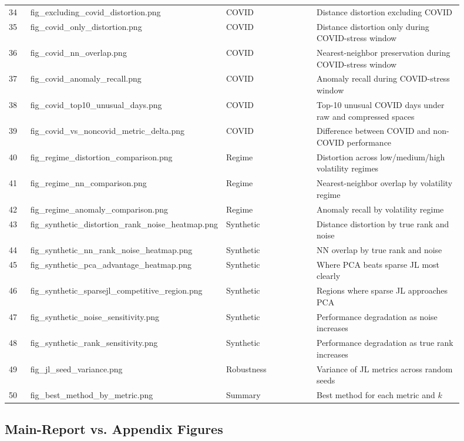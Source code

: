 \documentclass[11pt]{article}
\begin{document}
\begin{longtable}{p{0.05\linewidth} p{0.27\linewidth} p{0.22\linewidth} p{0.36\linewidth}}
34 & fig\_excluding\_covid\_distortion.png & COVID & Distance distortion excluding COVID \\
35 & fig\_covid\_only\_distortion.png & COVID & Distance distortion only during COVID-stress window \\
36 & fig\_covid\_nn\_overlap.png & COVID & Nearest-neighbor preservation during COVID-stress window \\
37 & fig\_covid\_anomaly\_recall.png & COVID & Anomaly recall during COVID-stress window \\
38 & fig\_covid\_top10\_unusual\_days.png & COVID & Top-10 unusual COVID days under raw and compressed spaces \\
39 & fig\_covid\_vs\_noncovid\_metric\_delta.png & COVID & Difference between COVID and non-COVID performance \\
40 & fig\_regime\_distortion\_comparison.png & Regime & Distortion across low/medium/high volatility regimes \\
41 & fig\_regime\_nn\_comparison.png & Regime & Nearest-neighbor overlap by volatility regime \\
42 & fig\_regime\_anomaly\_comparison.png & Regime & Anomaly recall by volatility regime \\
43 & fig\_synthetic\_distortion\_rank\_noise\_heatmap.png & Synthetic & Distance distortion by true rank and noise \\
44 & fig\_synthetic\_nn\_rank\_noise\_heatmap.png & Synthetic & NN overlap by true rank and noise \\
45 & fig\_synthetic\_pca\_advantage\_heatmap.png & Synthetic & Where PCA beats sparse JL most clearly \\
46 & fig\_synthetic\_sparsejl\_competitive\_region.png & Synthetic & Regions where sparse JL approaches PCA \\
47 & fig\_synthetic\_noise\_sensitivity.png & Synthetic & Performance degradation as noise increases \\
48 & fig\_synthetic\_rank\_sensitivity.png & Synthetic & Performance degradation as true rank increases \\
49 & fig\_jl\_seed\_variance.png & Robustness & Variance of JL metrics across random seeds \\
50 & fig\_best\_method\_by\_metric.png & Summary & Best method for each metric and $k$ \\
\bottomrule
\end{longtable}

\subsection{Main-Report vs. Appendix Figures}
\end{document}
